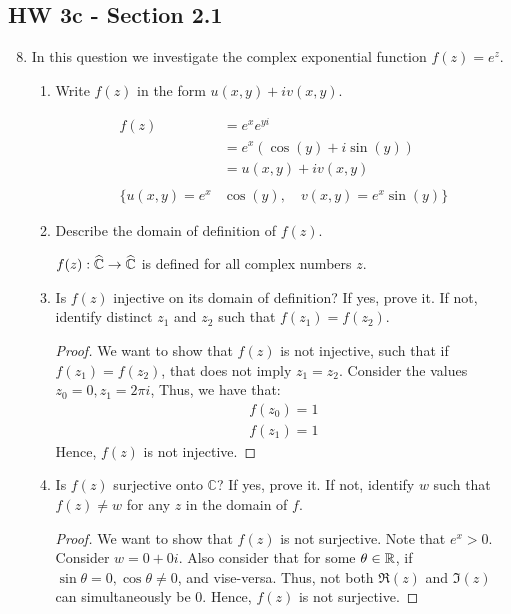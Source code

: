 \subsection*{HW 3c - Section 2.1}
\begin{enumerate}
\setcounter{enumi}{7}
\item In this question we investigate the complex exponential function $f(z) = e^z$.
	\begin{enumerate}
		\item Write $f(z)$ in the form $u(x,y) + iv(x,y)$.
		\begin{problem}
			\begin{align*}
				f(z) &= e^xe^{yi}\\
				&=e^x(\cos(y) + i\sin(y))\\
				&= u(x,y) + iv(x,y)\\\\
				\{u(x,y) = e^x&\cos(y), \quad v(x,y) = e^x\sin(y)\}
			\end{align*}
		\end{problem}
		\item Describe the domain of definition of $f(z)$.
		\begin{problem}
			$f(z) : \widehat{\mathbb{C}} \to \widehat{\mathbb{C}}$ is defined for all complex numbers $z$. 
		\end{problem}
		\item Is $f(z)$ injective on its domain of definition? If yes, prove it. If not, identify distinct $z_1$ and $z_2$ such that $f(z_1) = f(z_2)$.
		\begin{proof}
			We want to show that $f(z)$ is not injective, such that if $f(z_1) = f(z_2) $, that does not imply $ z_1 = z_2$.\gline{}
			Consider the values $z_0 = 0, z_1 = 2\pi i$,  Thus, we have that:
			\begin{align*}
				f(z_0) = 1\\
				f(z_1) = 1
			\end{align*}
			Hence, $f(z)$ is not injective. 
		\end{proof}
		\item Is $f(z)$ surjective onto $\mathbb{C}$? If yes, prove it. If not, identify $w$ such that $f(z) \neq w$ for any $z$ in the domain of $f$.
		\begin{proof}
			We want to show that $f(z)$ is not surjective. Note that $e^x > 0$. \gline{}
			Consider $w = 0 + 0i$. Also consider that for some $\theta \in \mathbb{R}$, if $\sin\theta = 0, \cos\theta\ne 0$, and vise-versa. Thus, not both $\Re(z)$ and $\Im(z)$ can simultaneously be 0. \gline{}
			Hence, $f(z)$ is not surjective. 

\end{proof}
\end{enumerate}
\end{enumerate}
